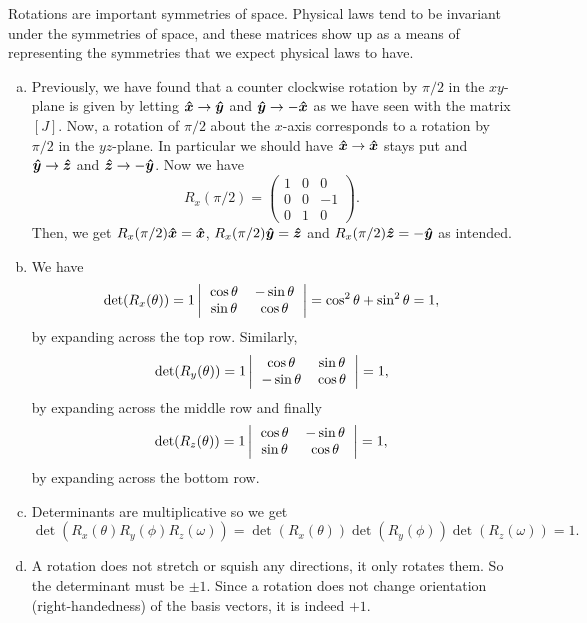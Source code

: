 \documentclass[12pt]{article} %
\begin{document}
\begin{solution} Rotations are important symmetries of space.  Physical laws tend to be invariant under the symmetries of space, and these matrices show up as a means of representing the symmetries that we expect physical laws to have.
    \begin{enumerate}[(a)]
        \item  Previously, we have found that a counter clockwise rotation by $\pi/2$ in the $xy$-plane is given by letting $\boldsymbol{\hat{x}} \to \boldsymbol{\hat{y}}$ and $\boldsymbol{\hat{y}} \to -\boldsymbol{\hat{x}}$ as we have seen with the matrix $[J]$.  Now, a rotation of $\pi/2$ about the $x$-axis corresponds to a rotation by $\pi/2$ in the $yz$-plane.  In particular we should have $\boldsymbol{\hat{x}} \to \boldsymbol{\hat{x}}$ stays put and $\boldsymbol{\hat{y}} \to \boldsymbol{\hat{z}}$ and $\boldsymbol{\hat{z}} \to -\boldsymbol{\hat{y}}$.  Now we have
        \[ 
            R_x(\pi/2) = \begin{pmatrix} 1 & 0 & 0 \\ 0 & 0 & -1 \\ 0 & 1 & 0 \end{pmatrix}.
        \]
        Then, we get $R_x(\pi/2)\boldsymbol{\hat{x}} = \boldsymbol{\hat{x}}$, $R_x(\pi/2)\boldsymbol{\hat{y}} = \boldsymbol{\hat{z}}$ and $R_x(\pi/2)\boldsymbol{\hat{z}} = -\boldsymbol{\hat{y}}$ as intended.
        \item We have
        \[
        \det(R_x(\theta)) = 1 \left| \begin{tabular}{cc} $\cos \theta$ & $-\sin \theta$ \\ $\sin \theta$ & $\cos \theta$ \end{tabular} \right| = \cos^2 \theta + \sin^2 \theta = 1,
        \]
        by expanding across the top row. Similarly,
                \[
        \det(R_y(\theta)) = 1 \left| \begin{tabular}{cc} $\cos \theta$ & $\sin \theta$ \\ $-\sin \theta$ & $\cos \theta$ \end{tabular} \right|  = 1,
        \]
        by expanding across the middle row and finally
        \[
        \det(R_z(\theta)) = 1 \left| \begin{tabular}{cc} $\cos \theta$ & $-\sin \theta$ \\ $\sin \theta$ & $\cos \theta$ \end{tabular} \right|  = 1,
        \]
        by expanding across the bottom row.
        \item Determinants are multiplicative so we get
        \[
            \det(R_x(\theta)R_y(\phi) R_z(\omega)) = \det(R_x(\theta)) \det(R_y(\phi)) \det(R_z(\omega)) = 1.
        \]
        \item A rotation does not stretch or squish any directions, it only rotates them.  So the determinant must be $\pm 1$.  Since a rotation does not change orientation (right-handedness) of the basis vectors, it is indeed $+1$.

\end{enumerate}
\end{solution}
\end{document}
